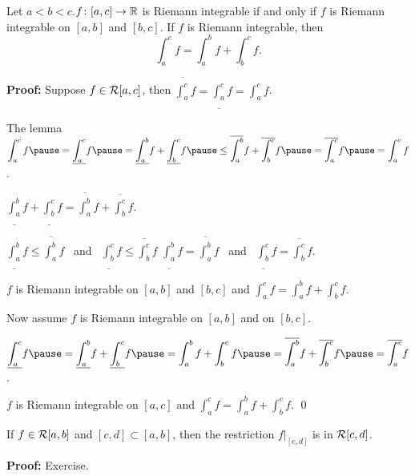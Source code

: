 \documentclass[10pt,aspectratio=169]{beamer}
\begin{document}
\begin{frame}

\begin{proposition}[Additivity]
Let $a < b < c$.\quad $f \colon [a,c] \to {\mathbb{R}}$ is Riemann integrable
if and only if $f$ is Riemann integrable on $[a,b]$ and $[b,c]$.
\pause
If
$f$ is Riemann integrable, then
\begin{equation*}
\int_a^c f
=
\int_a^b f
+
\int_b^c f .
\end{equation*}
\end{proposition}

\pause
\textbf{Proof:}
Suppose $f \in {\mathcal{R}}[a,c]$, then 
$\overline{\int_a^c} f = 
\underline{\int_a^c} f = 
\int_a^c f$.

\pause
\medskip

The lemma \wthus
$\displaystyle
\int_a^c f
\pause
=
\underline{\int_a^c} f
\pause
 =
\underline{\int_a^b} f + \underline{\int_b^c} f
\pause
 \leq
\overline{\int_a^b} f + \overline{\int_b^c} f
\pause
 =
\overline{\int_a^c} f
\pause
 =
\int_a^c f$.

\pause
\medskip

\thus \quad $\displaystyle
\underline{\int_a^b} f + \underline{\int_b^c} f
=
\overline{\int_a^b} f + \overline{\int_b^c} f$.

\pause
\medskip

$\displaystyle\underline{\int_a^b} f \leq \overline{\int_a^b} f$
~and~
$\displaystyle\underline{\int_b^c} f \leq \overline{\int_b^c} f$
\pause
\wthus
$\displaystyle
\underline{\int_a^b} f
=
\overline{\int_a^b} f$
~and~
$\displaystyle
\underline{\int_b^c} f
=
\overline{\int_b^c} f
$.

\pause
\medskip

\thus \quad $f$ is Riemann integrable on $[a,b]$ and $[b,c]$ and
$\int_a^c f
=
\int_a^b f
+
\int_b^c f$.
\end{frame}

\begin{frame}

Now assume $f$ is Riemann integrable on $[a,b]$ and on $[b,c]$.

\pause
\medskip

\quad
$\displaystyle
\underline{\int_a^c} f
\pause
=
\underline{\int_a^b} f + \underline{\int_b^c} f
\pause
=
\int_a^b f + \int_b^c f
\pause
=
\overline{\int_a^b} f + \overline{\int_b^c} f
\pause
=
\overline{\int_a^c} f$.

\pause
\medskip

\thus \quad $f$ is Riemann integrable on $[a,c]$ and
$\int_a^c f
=
\int_a^b f
+
\int_b^c f$.
\qed


\pause
\bigskip

\begin{corollary}
If $f \in {\mathcal{R}}[a,b]$ and
$[c,d] \subset [a,b]$, then
the restriction $f|_{[c,d]}$ is in ${\mathcal{R}}[c,d]$.
\end{corollary}

\pause
\textbf{Proof:} Exercise.

\end{frame}
\end{document}
